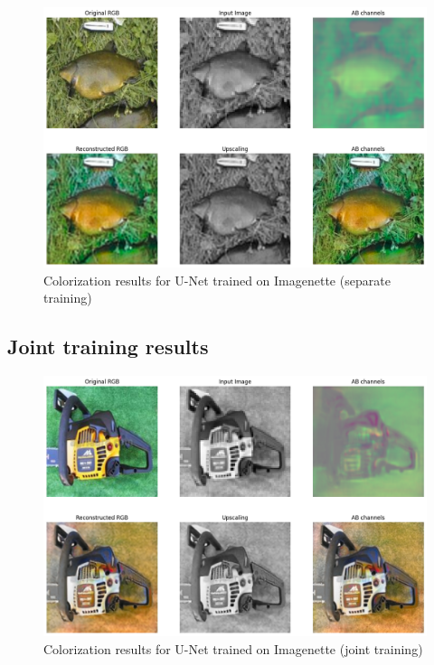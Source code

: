 \documentclass[aspectratio=169]{beamer}
\theoremstyle{definition}
\begin{document}
\begin{frame}
    \begin{figure}
        \centering
        \includegraphics[width=.75\textwidth]{demo-pipeline/fish2.png}
        \caption{Colorization results for U-Net trained on Imagenette (separate training)}
    \end{figure}
\end{frame}

\subsection{Joint training results}
\begin{frame}
    \tableofcontents[currentsubsection]
\end{frame}

\begin{frame}
    \begin{figure}
        \centering
        \includegraphics[width=.75\textwidth]{demo-both/chainsaw.png}
        \caption{Colorization results for U-Net trained on Imagenette (joint training)}
    \end{figure}
\end{frame}
\end{document}
